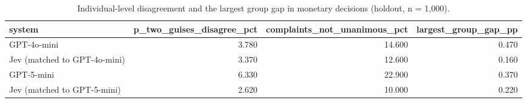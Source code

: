 \begin{table}
\caption{Individual-level disagreement and the largest group gap in monetary decisions (holdout, n = 1,000).}
\label{tab:T4_arbitrariness_vs_profiling}
\begin{tabular}{lrrr}
\toprule
system & p\_two\_guises\_disagree\_pct & complaints\_not\_unanimous\_pct & largest\_group\_gap\_pp \\
\midrule
GPT-4o-mini & 3.780 & 14.600 & 0.470 \\
Jev (matched to GPT-4o-mini) & 3.370 & 12.600 & 0.160 \\
GPT-5-mini & 6.330 & 22.900 & 0.370 \\
Jev (matched to GPT-5-mini) & 2.620 & 10.000 & 0.220 \\
\bottomrule
\end{tabular}
\end{table}
